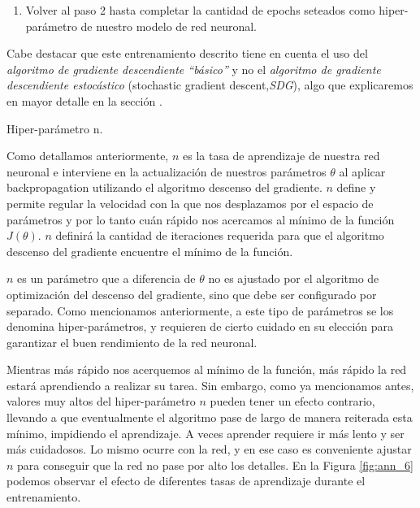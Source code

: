 \documentclass[12pt,a4paper]{article}
\makeatletter
\renewcommand\paragraph{\@startsection{paragraph}{4}{\z@}
            {-2.5ex\@plus -1ex \@minus -.25ex}
            {1.25ex \@plus .25ex}
            {\normalfont\normalsize\bfseries}}
\makeatother
\begin{document}
\begin{sloppypar}
\begin{enumerate}
\item Volver al paso 2 hasta completar la cantidad de epochs seteados como hiper-parámetro de nuestro modelo de red neuronal. 

\end{enumerate}

Cabe destacar que este entrenamiento descrito tiene en cuenta el uso del \textit{algoritmo de gradiente descendiente “básico”} y no el \textit{algoritmo de gradiente descendiente estocástico} (stochastic gradient descent,\textit{SDG}), algo que explicaremos en mayor detalle en la sección \textit{}.

\paragraph{Hiper-parámetro n.}\label{hiper_n}

Como detallamos anteriormente, $n$ es la tasa de aprendizaje de nuestra red neuronal e interviene en la actualización de nuestros parámetros  $\theta$ al aplicar backpropagation utilizando el algoritmo descenso del gradiente. $n$ define y permite regular la velocidad con la que nos desplazamos por el espacio de parámetros y por lo tanto cuán rápido nos acercamos al mínimo de la función $J(\theta)$. $n$ definirá la cantidad de iteraciones requerida para que el algoritmo descenso del gradiente encuentre el mínimo de la función.

$n$ es un parámetro que a diferencia de $\theta$ no es ajustado por el algoritmo de optimización del descenso del gradiente, sino que debe ser configurado por separado. Como mencionamos anteriormente, a este tipo de parámetros se los denomina hiper-parámetros, y requieren de cierto cuidado en su elección para garantizar el buen rendimiento de la red neuronal. 

Mientras más rápido nos acerquemos al mínimo de la función, más rápido la red estará aprendiendo a realizar su tarea. Sin embargo, como ya mencionamos antes, valores muy altos del hiper-parámetro $n$ pueden tener un efecto contrario, llevando a que eventualmente el algoritmo pase de largo de manera reiterada esta mínimo, impidiendo el aprendizaje. A veces aprender requiere ir más lento y ser más cuidadosos. Lo mismo ocurre con la red, y en ese caso es conveniente ajustar $n$ para conseguir que la red no pase por alto los detalles. En la Figura \ref{fig:ann_6} podemos observar el efecto de diferentes tasas de aprendizaje durante el entrenamiento. 


\end{sloppypar}
\end{document}
